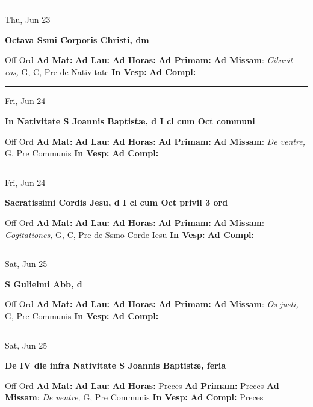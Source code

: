 \documentclass[letterpaper, 10pt]{article}
\begin{document}
\hrule
\begin{center}
Thu, Jun 23
\end{center}\textbf{ \large Octava Ssmi Corporis Christi, \textnormal{\normalsize dm}}
\begin{justify}
Off Ord
\textbf{Ad Mat: }
\textbf{Ad Lau: }
\textbf{Ad Horas: }
\textbf{Ad Primam: }
\textbf{Ad Missam}: \textit{Cibavit eos,} G, C, Pre de Nativitate
\textbf{In Vesp: }
\textbf{Ad Compl: }\end{justify}



\hrule
\begin{center}
Fri, Jun 24
\end{center}\textbf{ \large In Nativitate S Joannis Baptistæ, \textnormal{\normalsize d I cl cum Oct communi}}
\begin{justify}
Off Ord
\textbf{Ad Mat: }
\textbf{Ad Lau: }
\textbf{Ad Horas: }
\textbf{Ad Primam: }
\textbf{Ad Missam}: \textit{De ventre,} G, Pre Communis
\textbf{In Vesp: }
\textbf{Ad Compl: }\end{justify}



\hrule
\begin{center}
Fri, Jun 24
\end{center}\textbf{ \large Sacratissimi Cordis Jesu, \textnormal{\normalsize d I cl cum Oct privil 3 ord}}
\begin{justify}
Off Ord
\textbf{Ad Mat: }
\textbf{Ad Lau: }
\textbf{Ad Horas: }
\textbf{Ad Primam: }
\textbf{Ad Missam}: \textit{Cogitationes,} G, C, Pre de Ssmo Corde Iesu
\textbf{In Vesp: }
\textbf{Ad Compl: }\end{justify}



\hrule
\begin{center}
Sat, Jun 25
\end{center}\textbf{ \large S Gulielmi Abb, \textnormal{\normalsize d}}
\begin{justify}
Off Ord
\textbf{Ad Mat: }
\textbf{Ad Lau: }
\textbf{Ad Horas: }
\textbf{Ad Primam: }
\textbf{Ad Missam}: \textit{Os justi,} G, Pre Communis
\textbf{In Vesp: }
\textbf{Ad Compl: }\end{justify}



\hrule
\begin{center}
Sat, Jun 25
\end{center}\textbf{ \large De IV die infra Nativitate S Joannis Baptistæ, \textnormal{\normalsize feria}}
\begin{justify}
Off Ord
\textbf{Ad Mat: }
\textbf{Ad Lau: }
\textbf{Ad Horas: }Preces
\textbf{Ad Primam: }Preces
\textbf{Ad Missam}: \textit{De ventre,} G, Pre Communis
\textbf{In Vesp: }
\textbf{Ad Compl: }Preces\end{justify}
\end{document}
